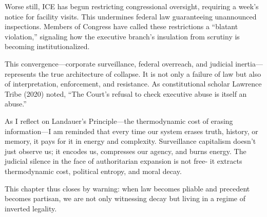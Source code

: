\documentclass[
]{article}
\begin{document}
Worse still, ICE has begun restricting congressional oversight, requiring a week's notice for facility visits. This undermines federal law guaranteeing unannounced inspections. Members of Congress have called these restrictions a ``blatant violation,'' signaling how the executive branch's insulation from scrutiny is becoming institutionalized.

This convergence—corporate surveillance, federal overreach, and judicial inertia—represents the true architecture of collapse. It is not only a failure of law but also of interpretation, enforcement, and resistance. As constitutional scholar Lawrence Tribe (2020) noted, ``The Court's refusal to check executive abuse is itself an abuse.''

As I reflect on Landauer's Principle---the thermodynamic cost of erasing information---I am reminded that every time our system erases truth, history, or memory, it pays for it in energy and complexity. Surveillance capitalism doesn't just observe us; it encodes us, compresses our agency, and burns energy. The judicial silence in the face of authoritarian expansion is not free- it extracts thermodynamic cost, political entropy, and moral decay.

This chapter thus closes by warning: when law becomes pliable and precedent becomes partisan, we are not only witnessing decay but living in a regime of inverted legality.
\end{document}
